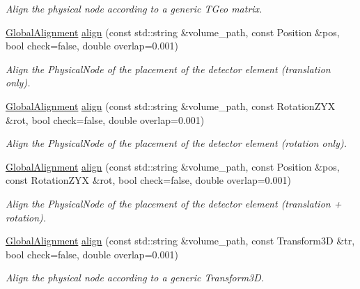 \begin{DoxyCompactItemize}
\begin{DoxyCompactList}\small\item\em Align the physical node according to a generic TGeo matrix. \item\end{DoxyCompactList}\item 
\hyperlink{class_d_d4hep_1_1_alignments_1_1_global_alignment}{GlobalAlignment} \hyperlink{class_d_d4hep_1_1_alignments_1_1_global_detector_alignment_a215336c1b789db3fc12eccbd207a028d}{align} (const std::string \&volume\_\-path, const Position \&pos, bool check=false, double overlap=0.001)
\begin{DoxyCompactList}\small\item\em Align the PhysicalNode of the placement of the detector element (translation only). \item\end{DoxyCompactList}\item 
\hyperlink{class_d_d4hep_1_1_alignments_1_1_global_alignment}{GlobalAlignment} \hyperlink{class_d_d4hep_1_1_alignments_1_1_global_detector_alignment_a6a1950c5f869be07e7291660bbbd4fde}{align} (const std::string \&volume\_\-path, const RotationZYX \&rot, bool check=false, double overlap=0.001)
\begin{DoxyCompactList}\small\item\em Align the PhysicalNode of the placement of the detector element (rotation only). \item\end{DoxyCompactList}\item 
\hyperlink{class_d_d4hep_1_1_alignments_1_1_global_alignment}{GlobalAlignment} \hyperlink{class_d_d4hep_1_1_alignments_1_1_global_detector_alignment_a9024ad900cf469292555be0b54ad1d60}{align} (const std::string \&volume\_\-path, const Position \&pos, const RotationZYX \&rot, bool check=false, double overlap=0.001)
\begin{DoxyCompactList}\small\item\em Align the PhysicalNode of the placement of the detector element (translation + rotation). \item\end{DoxyCompactList}\item 
\hyperlink{class_d_d4hep_1_1_alignments_1_1_global_alignment}{GlobalAlignment} \hyperlink{class_d_d4hep_1_1_alignments_1_1_global_detector_alignment_a6fd0199104c9626a04989370178c46d2}{align} (const std::string \&volume\_\-path, const Transform3D \&tr, bool check=false, double overlap=0.001)
\begin{DoxyCompactList}\small\item\em Align the physical node according to a generic Transform3D. \item\end{DoxyCompactList}\item 

\end{DoxyCompactItemize}

